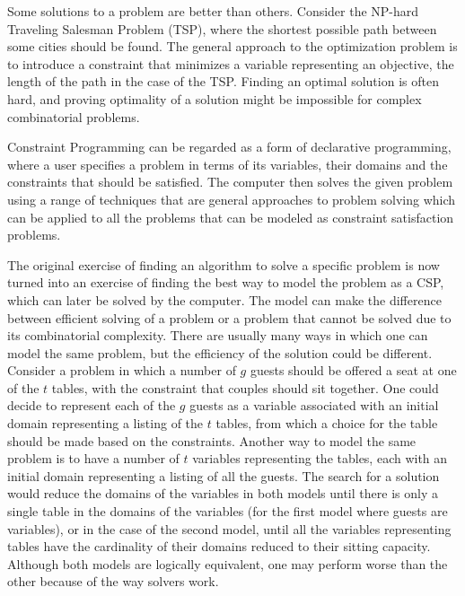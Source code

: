 \documentclass{l4proj}
\begin{document}
\noindent Some solutions to a problem are better than others. Consider the NP-hard Traveling Salesman Problem (TSP), where the shortest possible path between some cities should be found. The general approach to the optimization problem is to introduce a constraint that minimizes a variable representing an objective, the length of the path in the case of the TSP. Finding an optimal solution is often hard, and proving optimality of a solution might be impossible for complex combinatorial problems.

\noindent Constraint Programming can be regarded as a form of declarative programming, where a user specifies a problem in terms of its variables, their domains and the constraints that should be satisfied. The computer then solves the given problem using a range of techniques that are general approaches to problem solving which can be applied to all the problems that can be modeled as constraint satisfaction problems.

\noindent The original exercise of finding an algorithm to solve a specific problem is now turned into an exercise of finding the best way to model the problem as a CSP, which can later be solved by the computer. The model can make the difference between efficient solving of a problem or a problem that cannot be solved due to its combinatorial complexity. There are usually many ways in which one can model the same problem, but the efficiency of the solution could be different. Consider a problem in which a number of $g$ guests should be offered a seat at one of the $t$ tables, with the constraint that couples should sit together. One could decide to represent each of the $g$ guests as a variable associated with an initial domain representing a listing of the $t$ tables, from which a choice for the table should be made based on the constraints. Another way to model the same problem is to have a number of $t$ variables representing the tables, each with an initial domain representing a listing of all the guests. The search for a solution would reduce the domains of the variables in both models until there is only a single table in the domains of the variables (for the first model where guests are variables), or in the case of the second model, until all the variables representing tables have the cardinality of their domains reduced to their sitting capacity. Although both models are logically equivalent, one may perform worse than the other because of the way solvers work.
\end{document}
